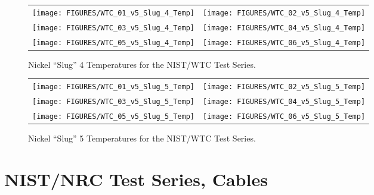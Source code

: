 \begin{figure}[h!]
\begin{tabular*}{\textwidth}{l@{\extracolsep{\fill}}r}
\texttt{[image: FIGURES/WTC\_01\_v5\_Slug\_4\_Temp]} &
\texttt{[image: FIGURES/WTC\_02\_v5\_Slug\_4\_Temp]} \\
\texttt{[image: FIGURES/WTC\_03\_v5\_Slug\_4\_Temp]} &
\texttt{[image: FIGURES/WTC\_04\_v5\_Slug\_4\_Temp]} \\
\texttt{[image: FIGURES/WTC\_05\_v5\_Slug\_4\_Temp]} &
\texttt{[image: FIGURES/WTC\_06\_v5\_Slug\_4\_Temp]}
\end{tabular*}
\caption{Nickel ``Slug'' 4 Temperatures for the NIST/WTC Test Series.}
\label{NIST_WTC Slug_4}
\end{figure}

\begin{figure}[h!]
\begin{tabular*}{\textwidth}{l@{\extracolsep{\fill}}r}
\texttt{[image: FIGURES/WTC\_01\_v5\_Slug\_5\_Temp]} &
\texttt{[image: FIGURES/WTC\_02\_v5\_Slug\_5\_Temp]} \\
\texttt{[image: FIGURES/WTC\_03\_v5\_Slug\_5\_Temp]} &
\texttt{[image: FIGURES/WTC\_04\_v5\_Slug\_5\_Temp]} \\
\texttt{[image: FIGURES/WTC\_05\_v5\_Slug\_5\_Temp]} &
\texttt{[image: FIGURES/WTC\_06\_v5\_Slug\_5\_Temp]}
\end{tabular*}
\caption{Nickel ``Slug'' 5 Temperatures for the NIST/WTC Test Series.}
\label{NIST_WTC Slug_5}
\end{figure}




\clearpage

\section{NIST/NRC Test Series, Cables}

